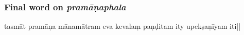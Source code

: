 \subsubsection{Final word on \emph{pramāṇaphala}}
tasmāt pramāṇa%
mānamātram eva kevalaṃ paṇḍitam 
ity upekṣaṇī\mde yam iti||
%
%

